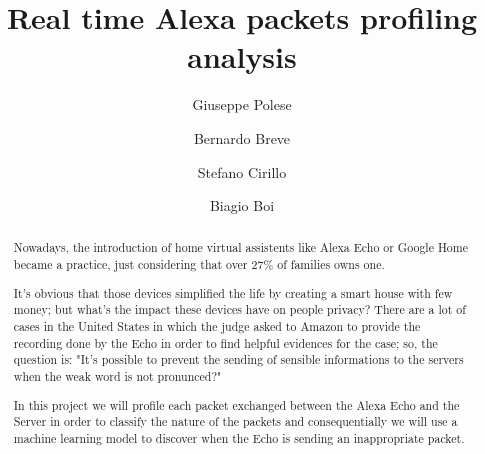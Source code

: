\documentclass[sigconf]{acmart}
\begin{document}
    \title{Real time Alexa packets profiling analysis}


    \author{Giuseppe Polese}

    \author{Bernardo Breve}
    \author{Stefano Cirillo}

    \author{Biagio Boi}

    \begin{abstract}
        Nowadays, the introduction of home virtual assistents like Alexa Echo or Google Home became a practice, just considering that over 27\% of families owns one.

        It's obvious that those devices simplified the life by creating a smart house with few money; but what's the impact these devices have on people privacy?
        There are a lot of cases in the United States in which the judge asked to Amazon to provide the recording done by the Echo in order to find helpful
        evidences for the case; so, the question is: "It's possible to prevent the sending of sensible informations to the servers when the weak word is not pronunced?"

        In this project we will profile each packet exchanged between the Alexa Echo and the Server in order to classify the nature of the packets and consequentially we will use a machine learning model to discover when the Echo is sending an inappropriate packet.
    \end{abstract}
\end{document}
